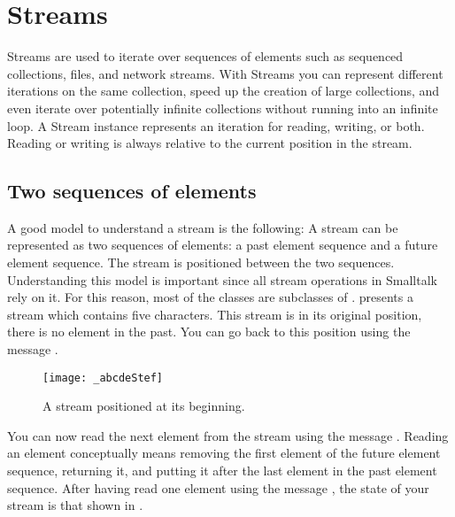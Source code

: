 \documentclass[a4paper,10pt,twoside]{book}
\begin{document}
	\renewcommand{\nnbb}[2]{} %
\fi
\chapter{Streams}\label{cha:streams}

Streams are used to iterate over sequences of elements such as sequenced collections, files, and network streams.
With Streams you can represent different iterations on the same collection, speed up the creation of large collections, and even iterate over potentially infinite collections without running into an infinite loop.
A Stream instance represents an iteration for reading, writing, or both.
Reading or writing is always relative to the current position in the stream.

\section{Two sequences of elements}
A good model to understand a stream is the following:
A stream can be represented as two sequences of elements: a past element sequence and a future element sequence.
The stream is positioned between the two sequences.
Understanding this model is important since all stream operations in Smalltalk rely on it.
For this reason, most of the  classes are subclasses of .
 presents a stream which contains five characters. This stream is in its original position, \ie there is no element in the past.
You can go back to this position using the message .

\begin{figure}[ht]
\centerline{\texttt{[image: \_abcdeStef]}}
\caption{A stream positioned at its beginning.}
\label{fig:_abcde}
\vspace{.2in}
\end{figure}

You can now read the next element from the stream using the message .
Reading an element conceptually means removing the first element of the future element sequence, returning it, and putting it after the last element in the past element sequence.
After having read one element using the message , the state of your stream is that shown in .
\end{document}
